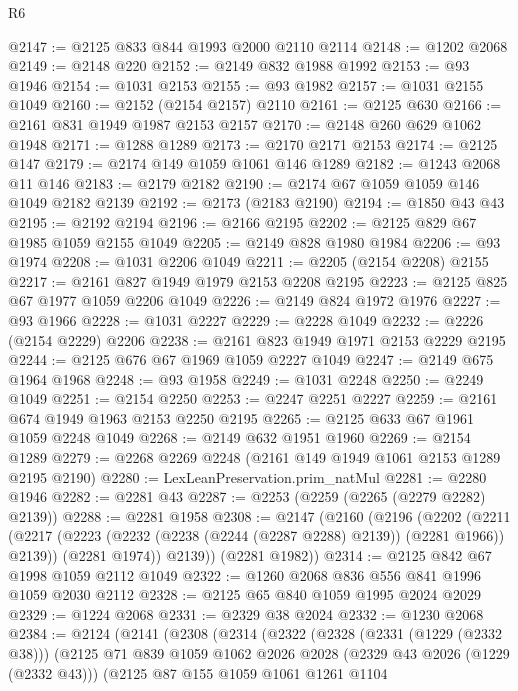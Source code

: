 \begin{lexlean}{R6}
\begin{coremodule}
@2147 := @2125 @833 @844 @1993 @2000 @2110 @2114
@2148 := @1202 @2068
@2149 := @2148 @220
@2152 := @2149 @832 @1988 @1992
@2153 := @93 @1946
@2154 := @1031 @2153
@2155 := @93 @1982
@2157 := @1031 @2155 @1049
@2160 := @2152 (@2154 @2157) @2110
@2161 := @2125 @630
@2166 := @2161 @831 @1949 @1987 @2153 @2157
@2170 := @2148 @260 @629 @1062 @1948
@2171 := @1288 @1289
@2173 := @2170 @2171 @2153
@2174 := @2125 @147
@2179 := @2174 @149 @1059 @1061 @146 @1289
@2182 := @1243 @2068 @11 @146
@2183 := @2179 @2182
@2190 := @2174 @67 @1059 @1059 @146 @1049 @2182 @2139
@2192 := @2173 (@2183 @2190)
@2194 := @1850 @43 @43
@2195 := @2192 @2194
@2196 := @2166 @2195
@2202 := @2125 @829 @67 @1985 @1059 @2155 @1049
@2205 := @2149 @828 @1980 @1984
@2206 := @93 @1974
@2208 := @1031 @2206 @1049
@2211 := @2205 (@2154 @2208) @2155
@2217 := @2161 @827 @1949 @1979 @2153 @2208 @2195
@2223 := @2125 @825 @67 @1977 @1059 @2206 @1049
@2226 := @2149 @824 @1972 @1976
@2227 := @93 @1966
@2228 := @1031 @2227
@2229 := @2228 @1049
@2232 := @2226 (@2154 @2229) @2206
@2238 := @2161 @823 @1949 @1971 @2153 @2229 @2195
@2244 := @2125 @676 @67 @1969 @1059 @2227 @1049
@2247 := @2149 @675 @1964 @1968
@2248 := @93 @1958
@2249 := @1031 @2248
@2250 := @2249 @1049
@2251 := @2154 @2250
@2253 := @2247 @2251 @2227
@2259 := @2161 @674 @1949 @1963 @2153 @2250 @2195
@2265 := @2125 @633 @67 @1961 @1059 @2248 @1049
@2268 := @2149 @632 @1951 @1960
@2269 := @2154 @1289
@2279 := @2268 @2269 @2248 (@2161 @149 @1949 @1061 @2153 @1289 @2195 @2190)
@2280 := LexLeanPreservation.prim_natMul
@2281 := @2280 @1946
@2282 := @2281 @43
@2287 := @2253 (@2259 (@2265 (@2279 @2282) @2139))
@2288 := @2281 @1958
@2308 := @2147
    (@2160
      (@2196
        (@2202
          (@2211
            (@2217 (@2223 (@2232 (@2238 (@2244 (@2287 @2288) @2139)) (@2281 @1966)) @2139))
            (@2281 @1974))
          @2139))
      (@2281 @1982))
@2314 := @2125 @842 @67 @1998 @1059 @2112 @1049
@2322 := @1260 @2068 @836 @556 @841 @1996 @1059 @2030 @2112
@2328 := @2125 @65 @840 @1059 @1995 @2024 @2029
@2329 := @1224 @2068
@2331 := @2329 @38 @2024
@2332 := @1230 @2068
@2384 := @2124
    (@2141
      (@2308
        (@2314
          (@2322
            (@2328
              (@2331 (@1229 (@2332 @38)))
              (@2125
                @71
                @839
                @1059
                @1062
                @2026
                @2028
                (@2329 @43 @2026 (@1229 (@2332 @43)))
                (@2125
                  @87
                  @155
                  @1059
                  @1061
                  @1261
                  @1104

\end{coremodule}
\end{lexlean}
